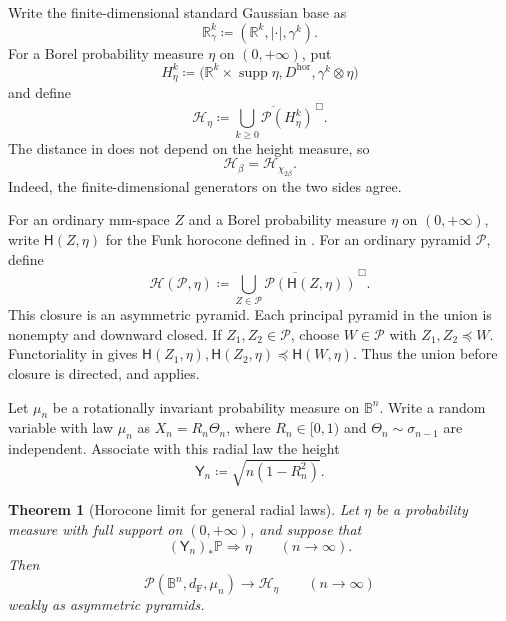 \documentclass[10pt,a4paper]{amsart}
\numberwithin{equation}{section}
\newtheorem{theorem}{Theorem}[section]
\newcommand{\R}{\mathbb R}
\newcommand{\B}{\mathbb B}
\newcommand{\Pyr}{\mathcal P}
\DeclareMathOperator{\supp}{supp}
\newcommand{\dF}{d_{\mathrm F}}
\begin{document}
Write the finite-dimensional standard Gaussian base as
\begin{equation}\label{eq:Gaussian-base-space} \mathbb R_\gamma^k\coloneqq(\R^k,|\cdot|,\gamma^k). \end{equation}
For a Borel probability measure $\eta$ on $(0,+\infty)$, put
\begin{equation}\label{eq:general-height-generator}
 H_\eta^k\coloneqq\bigl(\R^k\times\supp\eta,D^{\mathrm{hor}},\gamma^k\otimes\eta\bigr)
\end{equation}
and define
\begin{equation}\label{eq:general-horocone-pyramid}
 \mathcal H_\eta\coloneqq\overline{\bigcup_{k\ge0}\Pyr(H_\eta^k)}^{\,\Box}.
\end{equation}
The distance in  does not depend on the height measure, so
\begin{equation}\label{eq:Hbeta-height-specialization} \mathcal H_\beta=\mathcal H_{\chi_{2\beta}}. \end{equation}
Indeed, the finite-dimensional generators on the two sides agree.

For an ordinary mm-space $Z$ and a Borel probability measure $\eta$ on $(0,+\infty)$, write
$\mathsf H(Z,\eta)$ for the Funk horocone defined in .  For an ordinary pyramid
$\mathcal P$, define
\begin{equation}\label{eq:joint-horocone-pyramid}
 \mathcal H(\mathcal P,\eta)
 \coloneqq\overline{\bigcup_{Z\in\mathcal P}
 \Pyr(\mathsf H(Z,\eta))}^{\,\Box}.
\end{equation}
This closure is an asymmetric pyramid.  Each principal pyramid in the union is nonempty and downward closed.  If
$Z_1,Z_2\in\mathcal P$, choose $W\in\mathcal P$ with $Z_1,Z_2\preceq W$.  Functoriality in
 gives
$\mathsf H(Z_1,\eta),\mathsf H(Z_2,\eta)\preceq\mathsf H(W,\eta)$.  Thus the union before closure is directed, and
 applies.

Let $\mu_n$ be a rotationally invariant probability measure on $\B^n$.  Write a random variable with law $\mu_n$ as
$X_n=R_n\Theta_n$, where $R_n\in[0,1)$ and $\Theta_n\sim\sigma_{n-1}$ are independent.  Associate with this radial law the height
\begin{equation}\label{eq:general-radial-height} \mathsf Y_n\coloneqq\sqrt{n(1-R_n^2)}. \end{equation}

\begin{theorem}[Horocone limit for general radial laws]\label{thm:radial-law-transfer}
Let $\eta$ be a probability measure with full support on $(0,+\infty)$, and suppose that
\begin{equation}\label{eq:height-convergence-assumption}
 (\mathsf Y_n)_*\mathbb P\Rightarrow\eta\qquad(n\to\infty).
\end{equation}
Then
\begin{equation}\label{eq:radial-law-pyramid-limit}
 \Pyr(\B^n,\dF,\mu_n)\longrightarrow\mathcal H_\eta\qquad(n\to\infty)
\end{equation}
weakly as asymmetric pyramids.
\end{theorem}
\end{document}
